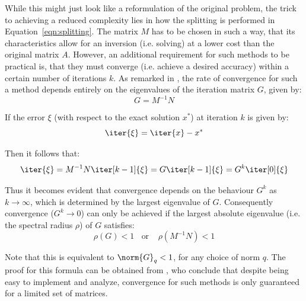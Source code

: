 \noindent While this might just look like a reformulation of the original problem, the trick to achieving a reduced complexity lies in how the splitting is performed in Equation~\hyperref[eqn:splitting]{\ref{eqn:splitting}}. The matrix $M$ has to be chosen in such a way, that its characteristics allow for an inversion (i.e. solving) at a lower cost than the original matrix $A$. However, an additional requirement for such methods to be practical is, that they must converge (i.e. achieve a desired accuracy) within a certain number of iterations $k$. As remarked in \cite{golub_matrix_2013}, the rate of convergence for such a method depends entirely on the eigenvalues of the iteration matrix $G$, given by:
\begin{equation}
    G=M^{-1}N    
\end{equation}

\noindent If the error $\xi$ (with respect to the exact solution $x^*$) at iteration $k$ is given by:
\begin{equation}
    \iter{\xi} = \iter{x} -x^*
\end{equation}

\noindent Then it follows that:
\begin{equation}
    \iter{\xi} = M^{-1}N\iter[k-1]{\xi} = G\iter[k-1]{\xi}=G^k\iter[0]{\xi}
\end{equation}

\noindent Thus it becomes evident that convergence depends on the behaviour $G^k$ as $k \rightarrow \infty$, which is determined by the largest eigenvalue of $G$. Consequently convergence ($G^k \rightarrow 0$) can only be achieved if the largest absolute eigenvalue (i.e. the spectral radius $\rho$) of $G$ satisfies:
\begin{equation}
\label{eqn:convergence}
    \rho(G) < 1 \;\;\text{ or }\;\;\ \rho(M^{-1}N)<1 
\end{equation}

\noindent Note that this is equivalent to $\norm{G}_q<1$, for any choice of norm $q$. The proof for this formula can be obtained from \cite{golub_matrix_2013}, who conclude that despite being easy to implement and analyze, convergence for such methods is only guaranteed for a limited set of matrices.


